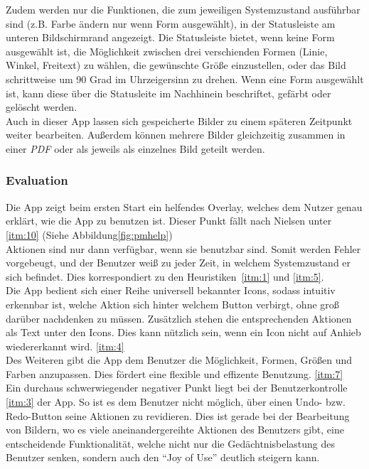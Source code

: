 Zudem werden nur die Funktionen, die zum jeweiligen Systemzustand ausführbar sind (z.B. Farbe ändern nur wenn Form ausgewählt), in der Statusleiste am unteren Bildschirmrand angezeigt.
Die Statusleiste bietet, wenn keine Form ausgewählt ist, die Möglichkeit zwischen drei verschienden Formen (Linie, Winkel, Freitext) zu wählen, die gewünschte Größe einzustellen, oder das Bild schrittweise um 90 Grad im Uhrzeigersinn zu drehen.
Wenn eine Form ausgewählt ist, kann diese über die Statusleite im Nachhinein beschriftet, gefärbt oder gelöscht werden. \\

Auch in dieser App lassen sich gespeicherte Bilder zu einem späteren Zeitpunkt weiter bearbeiten.
Außerdem können mehrere Bilder gleichzeitig zusammen in einer \emph{PDF} oder als jeweils als einzelnes Bild geteilt werden.

\subsubsection{Evaluation}
Die App zeigt beim ersten Start ein helfendes Overlay, welches dem Nutzer genau erklärt, wie die App zu benutzen ist. Dieser Punkt fällt nach Nielsen unter \ref{itm:10} (Siehe Abbildung\ref{fig:pmhelp}) \\
 
Aktionen sind nur dann verfügbar, wenn sie benutzbar sind. Somit werden Fehler vorgebeugt, und der Benutzer weiß zu jeder Zeit, in welchem Systemzustand er sich befindet. Dies korrespondiert zu den Heuristiken~\ref{itm:1} und \ref{itm:5}.  \\

Die App bedient sich einer Reihe universell bekannter Icons, sodass intuitiv erkennbar ist, welche Aktion sich hinter welchem Button verbirgt, ohne groß darüber nachdenken zu müssen. Zusätzlich stehen die entsprechenden Aktionen als Text unter den Icons. Dies kann nützlich sein, wenn ein Icon nicht auf Anhieb wiedererkannt wird. \ref{itm:4}  \\

Des Weiteren gibt die App dem Benutzer die Möglichkeit, Formen, Größen und Farben anzupassen. Dies fördert eine flexible und effizente Benutzung. \ref{itm:7} \\

Ein durchaus schwerwiegender negativer Punkt liegt bei der Benutzerkontrolle \ref{itm:3} der App. So ist es dem Benutzer nicht möglich, über einen Undo- bzw. Redo-Button seine Aktionen zu revidieren. Dies ist gerade bei der Bearbeitung von Bildern, wo es viele aneinandergereihte Aktionen des Benutzers gibt, eine entscheidende Funktionalität, welche nicht nur die Gedächtnisbelastung des Benutzer senken, sondern auch den ``Joy of Use'' deutlich steigern kann. \\

